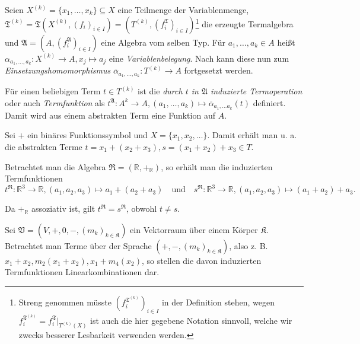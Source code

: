 \vspace*{-\lineskip}

\begin{definition}
    Seien $X^{(k)} = \{x_1, \ldots, x_k\} \subseteq X$ eine Teilmenge der Variablenmenge, $\mathfrak{T}^{(k)} = \mathfrak{T}(X^{(k)}, (f_i)_{i \in I}) = (T^{(k)}, (f_i^\mathfrak{T})_{i \in I})$\footnote{Streng genommen müsste $(f_i^{\mathfrak{T}^{(k)}})_{i\in I}$ in der Definition stehen, wegen $f_i^{\mathfrak{T}^{(k)}}=f_i^\mathfrak{T}\vert_{T^{(k)}(X)}$ ist auch die hier gegebene Notation sinnvoll, welche wir zwecks besserer Lesbarkeit verwenden werden.} die erzeugte Termalgebra und $\mathfrak{A} = (A, (f_i^\mathfrak{A})_{i \in I})$ eine Algebra vom selben Typ. Für $a_1, \ldots, a_k \in A$ heißt $\alpha_{a_1, \ldots, a_k}: X^{(k)} \to A, x_j \mapsto a_j$ eine \emph{Variablenbelegung}. Nach  kann diese nun zum \emph{Einsetzungshomomorphismus} $\overline{\alpha}_{a_1, \ldots, a_k}: T^{(k)} \to A$ fortgesetzt werden.

    Für einen beliebigen Term $t \in T^{(k)}$ ist die \emph{durch $t$ in $\mathfrak{A}$ induzierte Termoperation} oder auch \emph{Termfunktion} als $t^\mathfrak{A}: A^k \to A, (a_1, \ldots, a_k) \mapsto \overline{\alpha}_{a_1, \ldots a_k}(t)$ definiert. Damit wird aus einem abstrakten Term eine Funktion auf $A$.
\end{definition}

\begin{example}
    Sei $+$ ein binäres Funktionssymbol und $X = \{x_1, x_2, \ldots \}$. Damit erhält man u. a. die abstrakten Terme $t = x_1 + (x_2 + x_3), s = (x_1 + x_2) + x_3 \in T$.

    Betrachtet man die Algebra $\mathfrak{R} = (\mathbb{R}, +_\mathbb{R})$, so erhält man die induzierten Termfunktionen $$t^\mathfrak{R}: \mathbb{R}^3 \to \mathbb{R}, (a_1, a_2, a_3) \mapsto a_1 + (a_2 + a_3) \quad \text{und} \quad s^\mathfrak{R}: \mathbb{R}^3 \to \mathbb{R}, (a_1, a_2, a_3) \mapsto (a_1 + a_2) + a_3.$$

    Da $+_\mathbb{R}$ assoziativ ist, gilt $t^\mathfrak{R} = s^\mathfrak{R}$, obwohl $t \neq s$.
\end{example}

\begin{example}
    Sei $\mathfrak{V} = (V, +, 0, -, (m_k)_{k \in \mathfrak{K}})$ ein Vektorraum über einem Körper $\mathfrak{K}$. Betrachtet man Terme über der Sprache $(+, -, (m_k)_{k \in \mathfrak{K}})$, also z. B. $x_1 + x_2, m_2(x_1 + x_2), x_1 + m_4(x_2)$, so stellen die davon induzierten Termfunktionen Linearkombinationen dar.
\end{example}


